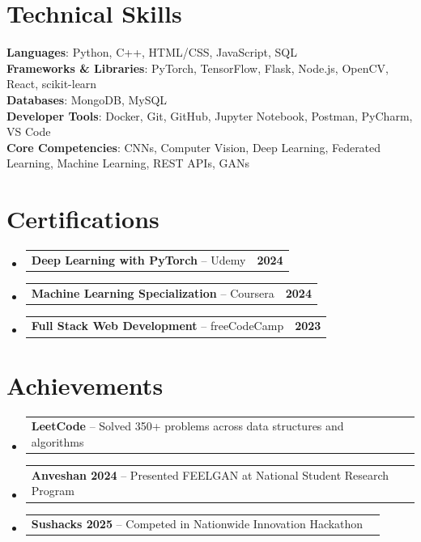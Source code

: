 \documentclass[letterpaper,11pt]{article}
\makeatletter
\newcommand{\resumeProjectHeading}[2]{
    \item
    \begin{tabular*}{1.001\textwidth}{l@{\extracolsep{\fill}}r}
      \small#1 & \textbf{\small #2}\\
    \end{tabular*}\vspace{-4pt}
}
\newcommand{\resumeSubHeadingListStart}{\begin{itemize}[leftmargin=0.0in, label={}, itemsep=2.5pt, parsep=0pt, topsep=1.5pt, partopsep=0pt]}
\newcommand{\resumeSubHeadingListEnd}{\end{itemize}}
\makeatother
\begin{document}
\section{Technical Skills}
 \begin{itemize}[leftmargin=0.15in, label={}, itemsep=0pt, parsep=0pt, topsep=0pt]
    \small{\item{
     \textbf{Languages}{: Python, C++, HTML/CSS, JavaScript, SQL} \\
     \textbf{Frameworks \& Libraries}{: PyTorch, TensorFlow, Flask, Node.js, OpenCV, React, scikit-learn} \\
     \textbf{Databases}{: MongoDB, MySQL} \\
     \textbf{Developer Tools}{: Docker, Git, GitHub, Jupyter Notebook, Postman, PyCharm, VS Code} \\
     \textbf{Core Competencies}{: CNNs, Computer Vision, Deep Learning, Federated Learning, Machine Learning, REST APIs, GANs} \\
    }}
 \end{itemize}
 \vspace{-16pt}

\section{Certifications}
    \resumeSubHeadingListStart
        \resumeProjectHeading
            {\textbf{Deep Learning with PyTorch} -- Udemy}{2024}
        \resumeProjectHeading
            {\textbf{Machine Learning Specialization} -- Coursera}{2024}
        \resumeProjectHeading
            {\textbf{Full Stack Web Development} -- freeCodeCamp}{2023}
    \resumeSubHeadingListEnd
\vspace{-14pt}

\section{Achievements}
    \resumeSubHeadingListStart
        \resumeProjectHeading
            {\textbf{LeetCode} -- Solved 350+ problems across data structures and algorithms}{}
        \resumeProjectHeading
            {\textbf{Anveshan 2024} -- Presented FEELGAN at National Student Research Program}{}
        \resumeProjectHeading
            {\textbf{Sushacks 2025} -- Competed in Nationwide Innovation Hackathon}{}
    \resumeSubHeadingListEnd
\end{document}
